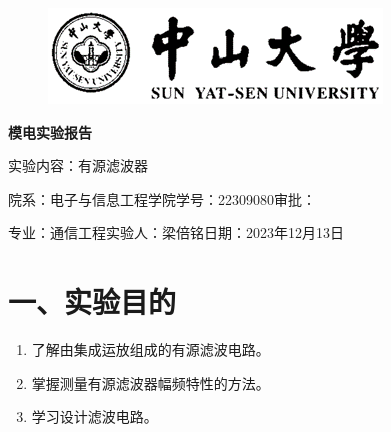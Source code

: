 \documentclass[a4paper,10pt,notitlepage]{article}
\begin{document}
	\large
	\onehalfspacing
	\begin{figure}[h]
		\raggedright
		\includegraphics{预习报告/1.png}
	\end{figure}
	\centering
	{\Huge\textbf{模电实验报告}\par}
	\vspace{0.2cm}
	{\huge{实验内容：有源滤波器}\par}
	\raggedright
	\vspace{0.3cm}
	\begin{centering}
		{\large 院系：电子与信息工程学院\hfill 学号：22309080\hfill 审批：\hspace{2cm} \par
			专业：通信工程\hfill 实验人：梁倍铭\hfill 日期：2023年12月13日 \par}
	\end{centering}
	\vspace{0.3cm}
	\section*{一、实验目的}
	\begin{enumerate}
		\item 了解由集成运放组成的有源滤波电路。
		\item 掌握测量有源滤波器幅频特性的方法。
		\item 学习设计滤波电路。
	\end{enumerate}
\end{document}

